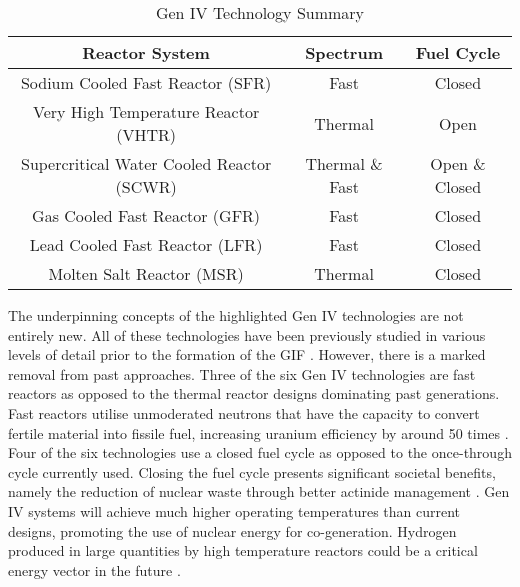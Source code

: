 \documentclass[journal]{IEEEtran}
\begin{document}
\begin{table}[!t]
\renewcommand{\arraystretch}{1.3}
\caption{Gen IV Technology Summary \cite{GenIVRoadmap, Marques2010a}}
\label{table:GenIV}
\centering
\begin{tabular}{|c|c|c|}
\hline
\textbf{Reactor System} & \textbf{Spectrum} & \textbf{Fuel Cycle}\\
\hline
Sodium Cooled Fast Reactor (SFR) & Fast & Closed \\
\hline
Very High Temperature Reactor (VHTR) & Thermal & Open \\
\hline
Supercritical Water Cooled Reactor (SCWR) & Thermal \& Fast & Open \& Closed \\
\hline
Gas Cooled Fast Reactor (GFR) & Fast & Closed \\
\hline
Lead Cooled Fast Reactor (LFR) & Fast & Closed \\
\hline
Molten Salt Reactor (MSR) & Thermal & Closed \\
\hline

\end{tabular}
\end{table}

The underpinning concepts of the highlighted Gen IV technologies are not entirely new. 
All of these technologies have been previously studied in various levels of detail prior to the formation of the GIF \cite{Marques2010a}. However, there is a marked removal from past approaches. 
Three of the six Gen IV technologies are fast reactors as opposed to the thermal reactor designs dominating past generations.
Fast reactors utilise unmoderated neutrons that have the capacity to convert fertile material into fissile fuel, increasing uranium efficiency by around 50 times \cite{Locatelli2013}. 
Four of the six technologies use a closed fuel cycle as opposed to the once-through cycle currently used. 
Closing the fuel cycle presents significant societal benefits, namely the reduction of nuclear waste through better actinide management \cite{GenIVRoadmap, Bhatnagar2011}. 
Gen IV systems will achieve much  higher operating temperatures than current designs, promoting the use of nuclear energy for co-generation. 
Hydrogen produced in large quantities by high temperature reactors could be a critical energy vector in the future \cite{ Bhatnagar2011}. 
\end{document}
